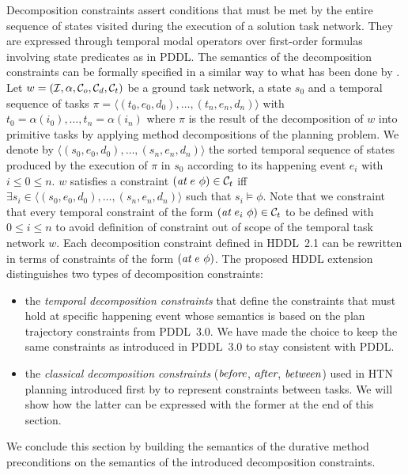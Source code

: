 \documentclass[letterpaper]{article} %
\newcommand{\at}{\text{\it at}}
\newcommand{\before}{\text{\it before}}
\newcommand{\after}{\text{\it after}}
\renewcommand{\between}{\text{\it between}}
\begin{document}
Decomposition constraints assert conditions that must be met by the entire sequence of states visited during the execution of a solution task network. They are expressed through temporal modal operators over first-order formulas involving state predicates as in PDDL. The semantics of the decomposition constraints can be formally specified in a similar way to what has been done by \citep{gerevini05}. Let $w = ({\cal{I}}, \alpha, {\cal{C}}_o, {\cal{C}}_d, {\cal{C}}_t)$ be a ground task network, a state $s_0$ and a temporal sequence of tasks $\pi = \langle (t_0, e_0, d_0), \ldots, (t_n, e_n, d_n) \rangle $ with $t_0 = \alpha(i_0), \ldots, t_n = \alpha(i_n)$ where $\pi$ is the result of the decomposition of $w$ into primitive tasks by applying method decompositions of the planning problem. We denote by $\langle (s_0, e_0, d_0), \ldots, (s_n, e_n, d_n) \rangle$ the sorted temporal sequence of states produced by the execution of $\pi$ in $s_0$ according to its happening event $e_i$ with $i \leq 0 \leq n$. $w$ satisfies a constraint $(\at \ e \ \phi) \in {\cal{C}}_t$ iff $\exists s_i \in \langle (s_0, e_0, d_0), \ldots, (s_n, e_n, d_n) \rangle$ such that $s_i \models \phi$. Note that we constraint that every temporal constraint of the form $(\at \ e_i \ \phi) \in {\cal{C}}_t$ to be defined with $0 \leq i \leq n$ to avoid definition of constraint out of scope of the temporal task network $w$. Each decomposition constraint defined in HDDL~2.1 can be rewritten in terms of constraints of the form $(\at \ e\ \phi)$. The proposed HDDL extension distinguishes two types of decomposition constraints:
\begin{itemize}
    \item the {\em temporal decomposition constraints} that define the constraints that must hold at specific happening event whose semantics is based on the plan trajectory constraints from PDDL~3.0. We have made the choice to keep the same constraints as introduced in PDDL~3.0 to stay consistent with PDDL.
    \item the {\em classical decomposition constraints} ($\before$, $\after$, $\between$) used in HTN planning introduced first by \citep{erol94} to represent constraints between tasks. We will show how the latter can be expressed with the former at the end of this section.
\end{itemize}

We conclude this section by building the semantics of the durative method preconditions on the semantics of the introduced decomposition constraints.
\end{document}
